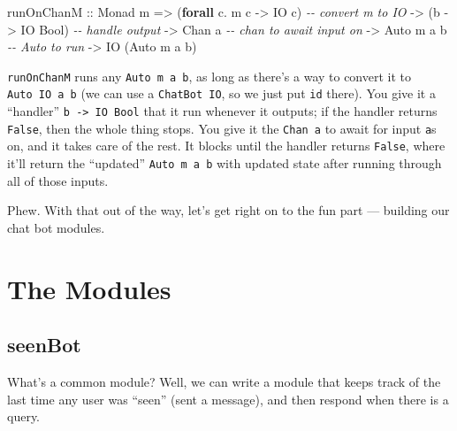 \documentclass[]{article}
\newenvironment{Shaded}{}{}
\newcommand{\CommentTok}[1]{\textcolor[rgb]{0.38,0.63,0.69}{\textit{#1}}}
\newcommand{\DataTypeTok}[1]{\textcolor[rgb]{0.56,0.13,0.00}{#1}}
\newcommand{\KeywordTok}[1]{\textcolor[rgb]{0.00,0.44,0.13}{\textbf{#1}}}
\newcommand{\NormalTok}[1]{#1}
\newcommand{\OperatorTok}[1]{\textcolor[rgb]{0.40,0.40,0.40}{#1}}
\newcommand{\OtherTok}[1]{\textcolor[rgb]{0.00,0.44,0.13}{#1}}
\begin{document}
\begin{Shaded}
\begin{Highlighting}[]
\OtherTok{runOnChanM ::} \DataTypeTok{Monad}\NormalTok{ m}
           \OtherTok{=>}\NormalTok{ (}\KeywordTok{forall}\NormalTok{ c}\OperatorTok{.}\NormalTok{ m c }\OtherTok{{-}>} \DataTypeTok{IO}\NormalTok{ c)   }\CommentTok{{-}{-} convert \textasciigrave{}m\textasciigrave{} to \textasciigrave{}IO\textasciigrave{}}
           \OtherTok{{-}>}\NormalTok{ (b }\OtherTok{{-}>} \DataTypeTok{IO} \DataTypeTok{Bool}\NormalTok{)            }\CommentTok{{-}{-} handle output}
           \OtherTok{{-}>} \DataTypeTok{Chan}\NormalTok{ a                    }\CommentTok{{-}{-} chan to await input on}
           \OtherTok{{-}>} \DataTypeTok{Auto}\NormalTok{ m a b                }\CommentTok{{-}{-} \textasciigrave{}Auto\textasciigrave{} to run}
           \OtherTok{{-}>} \DataTypeTok{IO}\NormalTok{ (}\DataTypeTok{Auto}\NormalTok{ m a b)}
\end{Highlighting}
\end{Shaded}

\texttt{runOnChanM} runs any \texttt{Auto\ m\ a\ b}, as long as there's a way to
convert it to \texttt{Auto\ IO\ a\ b} (we can use a \texttt{ChatBot\ IO}, so we
just put \texttt{id} there). You give it a ``handler''
\texttt{b\ -\textgreater{}\ IO\ Bool} that it run whenever it outputs; if the
handler returns \texttt{False}, then the whole thing stops. You give it the
\texttt{Chan\ a} to await for input \texttt{a}s on, and it takes care of the
rest. It blocks until the handler returns \texttt{False}, where it'll return the
``updated'' \texttt{Auto\ m\ a\ b} with updated state after running through all
of those inputs.

Phew. With that out of the way, let's get right on to the fun part --- building
our chat bot modules.

\hypertarget{the-modules}{%
\section{The Modules}\label{the-modules}}

\hypertarget{seenbot}{%
\subsection{seenBot}\label{seenbot}}

What's a common module? Well, we can write a module that keeps track of the last
time any user was ``seen'' (sent a message), and then respond when there is a
query.
\end{document}
